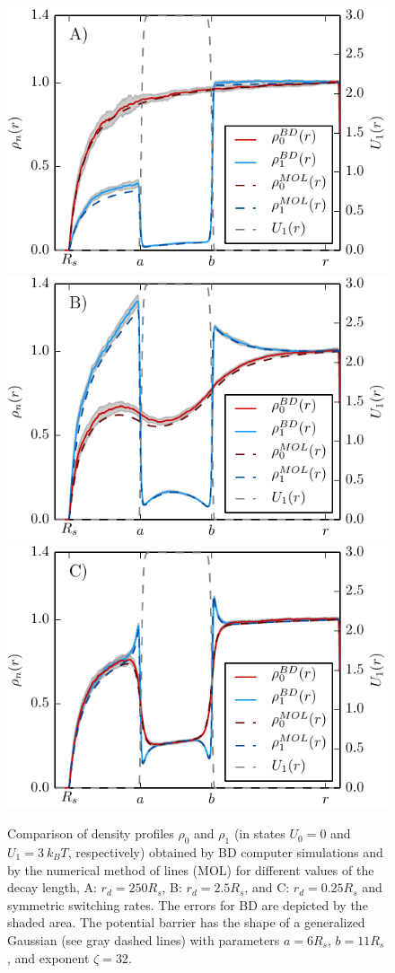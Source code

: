 \documentclass[preprint,superscriptaddress]{revtex4-1}
\begin{document}
\begin{figure}[H]
\begin{center}
\includegraphics[width= .35 \textwidth]{plots/rd250_numeric.pdf}
\includegraphics[width= .35 \textwidth]{plots/rd25_numeric.pdf}
\includegraphics[width= .35 \textwidth]{plots/rd025_numeric.pdf}
        \caption{Comparison of density profiles $\rho_0$ and $\rho_1$ (in states $U_0 = 0$ and $U_1 = 3 ~k_B T$, respectively) obtained by BD computer simulations and by the numerical method of lines (MOL) for different values of the decay length, A: $r_d = 250 R_s$, B: $r_d=2.5 R_s$, and C: $r_d=0.25 R_s$ and symmetric switching rates. The errors for BD are depicted by the shaded area. The potential barrier has the shape of a generalized Gaussian (see gray dashed lines) with parameters $a = 6 R_s$, $b = 11 R_s$, and exponent $\zeta = 32$. \label{Rho_numeric}} 
 \label{fig2}
 \end{center}
\end{figure}
\end{document}
